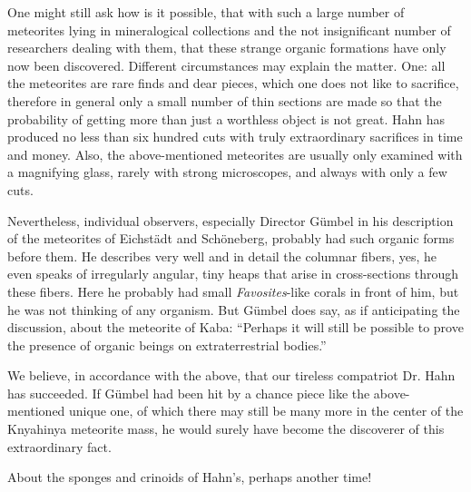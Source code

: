 \documentclass[a4paper, 12pt, oneside]{article}
\begin{document}
One might still ask how is it possible, that with such a large number of meteorites lying in mineralogical collections and the not insignificant number of researchers dealing with them, that these strange organic formations have only now been discovered. Different circumstances may explain the matter. One: all the meteorites are rare finds and dear pieces, which one does not like to sacrifice, therefore in general only a small number of thin sections are made so that the probability of getting more than just a worthless object is not great. Hahn has produced no less than six hundred cuts with truly extraordinary sacrifices in time and money. Also, the above-mentioned meteorites are usually only examined with a magnifying glass, rarely with strong microscopes, and always with only a few cuts.

Nevertheless, individual observers, especially Director Gümbel in his description of the meteorites of Eichstädt and Schöneberg, probably had such organic forms before them. He describes very well and in detail the columnar fibers, yes, he even speaks of irregularly angular, tiny heaps that arise in cross-sections through these fibers. Here he probably had small \emph{Favosites}-like corals in front of him, but he was not thinking of any organism. But Gümbel does say, as if anticipating the discussion, about the meteorite of Kaba: ``Perhaps it will still be possible to prove the presence of organic beings on extraterrestrial bodies.''

We believe, in accordance with the above, that our tireless compatriot Dr. Hahn has succeeded. If Gümbel had been hit by a chance piece like the above-mentioned unique one, of which there may still be many more in the center of the Knyahinya meteorite mass, he would surely have become the discoverer of this extraordinary fact.

About the sponges and crinoids of Hahn's, perhaps another time!

%
\textbigcircle%
%
\end{document}
